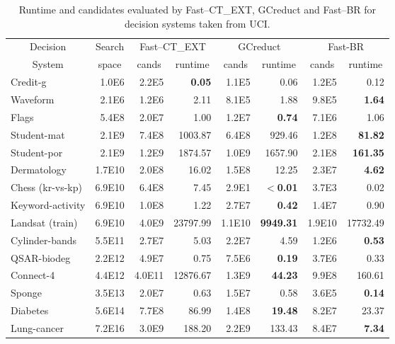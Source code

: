 \documentclass[letterpaper, twoside, openright, 12pt]{book}%
\begin{document}
	\begin{table}[H]
	    \centering \footnotesize
	    \caption{Runtime and candidates evaluated by Fast--CT\_EXT, GCreduct and Fast--BR for decision systems taken from UCI.}
	    \label{tab:java}
	    \begin{tabular}{lrrrrrrr}
		    \hline
		    \multicolumn{1}{c}{Decision} & \multicolumn{1}{c}{Search} & \multicolumn{2}{c}{Fast--CT\_EXT} & \multicolumn{2}{c}{GCreduct} & \multicolumn{2}{c}{Fast-BR} \\
		    \multicolumn{1}{c}{System}& \multicolumn{1}{c}{space} & \multicolumn{1}{c}{cands} & \multicolumn{1}{c}{runtime} & \multicolumn{1}{c}{cands} & \multicolumn{1}{c}{runtime} & \multicolumn{1}{c}{cands} & \multicolumn{1}{c}{runtime}\\
		    \hline
		    Credit-g         & 1.0E6  & 2.2E5  & \textbf{0.05} & 1.1E5  & 0.06             & 1.2E5  & 0.12            \\
		    Waveform         & 2.1E6  & 1.2E6  & 2.11          & 8.1E5  & 1.88             & 9.8E5  & \textbf{1.64}   \\ 
		    Flags            & 5.4E8  & 2.0E7  & 1.00          & 1.2E7  & \textbf{0.74}    & 7.1E6  & 1.06            \\
		    Student-mat      & 2.1E9  & 7.4E8  & 1003.87       & 6.4E8  & 929.46           & 1.2E8  & \textbf{81.82}  \\
		    Student-por      & 2.1E9  & 1.2E9  & 1874.57       & 1.0E9  & 1657.90          & 2.1E8  & \textbf{161.35} \\  
		    Dermatology      & 1.7E10 & 2.0E8  & 16.02         & 1.5E8  & 12.25            & 2.3E7  & \textbf{4.62}   \\ 
		    Chess (kr-vs-kp) & 6.9E10 & 6.4E8  & 7.45          & 2.9E1  & \textbf{$<$0.01} & 3.7E3  & 0.02            \\
		    Keyword-activity & 6.9E10 & 1.0E8  & 1.22          & 2.7E7  & \textbf{0.42}    & 1.4E7  & 0.90            \\
		    Landsat (train)  & 6.9E10 & 4.0E9  & 23797.99      & 1.1E10 & \textbf{9949.31} & 1.9E10 & 17732.49        \\
		    Cylinder-bands   & 5.5E11 & 2.7E7  & 5.03          & 2.2E7  & 4.59             & 1.2E6  & \textbf{0.53}   \\
		    QSAR-biodeg      & 2.2E12 & 4.9E7  & 0.75          & 7.5E6  & \textbf{0.19}    & 3.7E6  & 0.33            \\
		    Connect-4        & 4.4E12 & 4.0E11 & 12876.67      & 1.3E9  & \textbf{44.23}   & 9.9E8  & 160.61          \\
		    Sponge           & 3.5E13 & 2.0E7  & 0.63          & 1.5E7  & 0.58             & 3.6E5  & \textbf{0.14}   \\ 
		    Diabetes         & 5.6E14 & 7.7E8  & 86.99         & 1.4E8  & \textbf{19.48}   & 8.2E7  & 23.37           \\
		    Lung-cancer      & 7.2E16 & 3.0E9  & 188.20        & 2.2E9  & 133.43           & 8.4E7  & \textbf{7.34}   \\
	        \hline       
	    \end{tabular}
	\end{table}
%	
\end{document}
